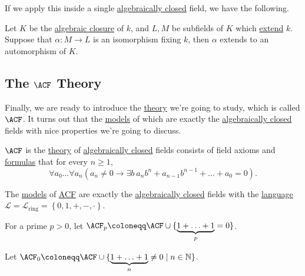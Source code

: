 If we apply this inside a single \hyperref[def:algebraically-closed]{algebraically closed} field, we have the following.

\begin{theorem}
	Let \(K\) be the \hyperref[def:algebraic-closure]{algebraic closure} of \(k\), and \(L, M\) be subfields of \(K\) which \hyperref[def:field-extension]{extend} \(k\). Suppose that \(\alpha \colon M \to L\) is an isomorphism fixing \(k\), then \(\alpha \) extends to an automorphism of \(K\).
\end{theorem}

\subsection{The \(\ACF\) Theory}
Finally, we are ready to introduce the \hyperref[def:theory]{theory} we're going to study, which is called \(\ACF\). It turns out that the \hyperref[def:model]{models} of which are exactly the \hyperref[def:algebraically-closed]{algebraically closed} fields with nice properties we're going to discuss.

\begin{definition}[\(\ACF\)]\label{def:ACF}
	\(\ACF\) is the \hyperref[def:theory]{theory} of \hyperref[def:algebraically-closed]{algebraically closed} fields consists of field axioms and \hyperref[def:formula]{formulas} that for every \(n \geq 1\),
	\[
		\forall a_0 \ldots \forall a_n \left( a_n \neq 0 \to \exists b\ a_n b^n + a_{n-1} b^{n-1} + \ldots + a_0 = 0\right) .
	\]
\end{definition}

\begin{remark}
	The \hyperref[def:model]{models} of \hyperref[def:ACF]{ACF} are exactly the \hyperref[def:algebraically-closed]{algebraically closed} fields with the \hyperref[def:language]{language} \(\mathcal{L} = \mathcal{L} _{\text{ring} } = \left\{ 0, 1, +, -, \cdot \right\} \).
\end{remark}

\begin{notation}[\(\ACF_p\)]
	For a prime \(p > 0\), let \(\ACF_p \coloneqq \ACF \cup \{\underbrace{1+\ldots +1}_{p} = 0\}\).
\end{notation}

\begin{notation}[\(\ACF_0\)]
	Let \(\ACF_0 \coloneqq \ACF \cup \{\underbrace{1+\ldots +1}_n \neq 0 \mid n\in \mathbb{N} \}\).
\end{notation}


